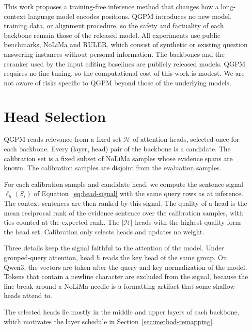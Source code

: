 \documentclass[11pt]{article}
\begin{document}
This work proposes a training-free inference method that changes how a long-context language model encodes positions. QGPM introduces no new model, training data, or alignment procedure, so the safety and factuality of each backbone remain those of the released model. All experiments use public benchmarks, NoLiMa and RULER, which consist of synthetic or existing question answering instances without personal information. The backbones and the reranker used by the input editing baselines are publicly released models. QGPM requires no fine-tuning, so the computational cost of this work is modest. We are not aware of risks specific to QGPM beyond those of the underlying models.






\appendix

\section{Head Selection}
\label{app:heads}

QGPM reads relevance from a fixed set $\mathcal{H}$ of attention heads, selected once for each backbone. Every (layer, head) pair of the backbone is a candidate. The calibration set is a fixed subset of NoLiMa samples whose evidence spans are known. The calibration samples are disjoint from the evaluation samples.

For each calibration sample and candidate head, we compute the sentence signal $\ell_h(S_i)$ of Equation~\ref{eq:head-signal} with the same query rows as at inference. The context sentences are then ranked by this signal. The quality of a head is the mean reciprocal rank of the evidence sentence over the calibration samples, with ties counted at the expected rank. The $|\mathcal{H}|$ heads with the highest quality form the head set. Calibration only selects heads and updates no weight.

Three details keep the signal faithful to the attention of the model. Under grouped-query attention, head $h$ reads the key head of the same group. On Qwen3, the vectors are taken after the query and key normalization of the model. Tokens that contain a newline character are excluded from the signal, because the line break around a NoLiMa needle is a formatting artifact that some shallow heads attend to.

The selected heads lie mostly in the middle and upper layers of each backbone, which motivates the layer schedule in Section~\ref{sec:method-remapping}.
\end{document}
